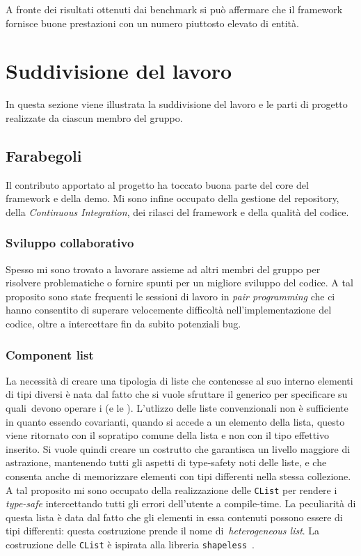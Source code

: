 A fronte dei risultati ottenuti dai benchmark si può affermare che il framework fornisce buone prestazioni con un numero
piuttosto elevato di entità.

\section{Suddivisione del lavoro}\label{sec:suddivisione-del-lavoro}
In questa sezione viene illustrata la suddivisione del lavoro e le parti di progetto realizzate da ciascun membro del
gruppo.

\subsection{Farabegoli}\label{subsec:farabegoli}
Il contributo apportato al progetto ha toccato buona parte del core del framework e della demo.
Mi sono infine occupato della gestione del repository, della \textit{Continuous Integration}, dei rilasci del framework
e della qualità del codice.

\subsubsection{Sviluppo collaborativo}
Spesso mi sono trovato a lavorare assieme ad altri membri del gruppo per risolvere problematiche o fornire spunti per
un migliore sviluppo del codice.
A tal proposito sono state frequenti le sessioni di lavoro in \textit{pair programming} che ci hanno consentito di
superare velocemente difficoltà nell'implementazione del codice, oltre a intercettare fin da subito potenziali bug.

\subsubsection{Component list}
La necessità di creare una tipologia di liste che contenesse al suo interno elementi di tipi diversi è nata dal fatto
che si vuole sfruttare il generico per specificare su quali~\Component devono operare i \System (e le \View).
L'utlizzo delle liste convenzionali non è sufficiente in quanto essendo covarianti, quando si accede a un elemento della
lista, questo viene ritornato con il sopratipo comune della lista e non con il tipo effettivo inserito.
Si vuole quindi creare un costrutto che garantisca un livello maggiore di astrazione, mantenendo tutti gli aspetti
di type-safety noti delle liste, e che consenta anche di memorizzare elementi con tipi differenti nella stessa
collezione.
A tal proposito mi sono occupato della realizzazione delle \texttt{CList} per rendere i \System \textit{type-safe}
intercettando tutti gli errori dell'utente a compile-time.
La peculiarità di questa lista è data dal fatto che gli elementi in essa contenuti possono essere di tipi differenti:
questa costruzione prende il nome di~\textit{heterogeneous list}.
La costruzione delle \texttt{CList} è ispirata alla libreria \texttt{shapeless}~\cite{shapeless}.

